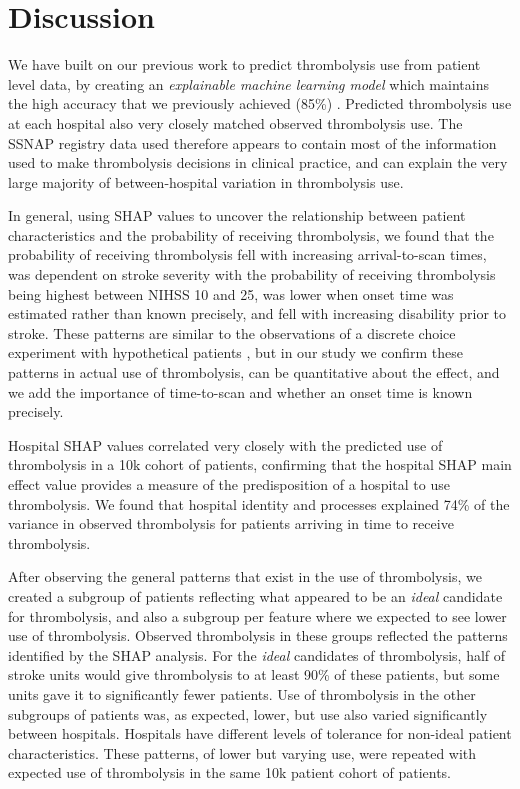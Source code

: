 \section{Discussion}

We have built on our previous work to predict thrombolysis use from patient level data, by creating an \emph{explainable machine learning model} which maintains the high accuracy that we previously achieved (85\%) \cite{allen_use_2022}. Predicted thrombolysis use at each hospital also very closely matched observed thrombolysis use. The SSNAP registry data used therefore appears to contain most of the information used to make thrombolysis decisions in clinical practice, and can explain the very large majority of between-hospital variation in thrombolysis use.

In general, using SHAP values to uncover the relationship between patient characteristics and the probability of receiving thrombolysis, we found that the probability of receiving thrombolysis fell with increasing arrival-to-scan times, was dependent on stroke severity with the probability of receiving thrombolysis being highest between NIHSS 10 and 25, was lower when onset time was estimated rather than known precisely, and fell with increasing disability prior to stroke. These patterns are similar to the observations of a discrete choice experiment with hypothetical patients \cite{de_brun_factors_2018}, but in our study we confirm these patterns in actual use of thrombolysis, can be quantitative about the effect, and we add the importance of time-to-scan and whether an onset time is known precisely. 

Hospital SHAP values correlated very closely with the predicted use of thrombolysis in a 10k cohort of patients, confirming that the hospital SHAP main effect value provides a measure of the predisposition of a hospital to use thrombolysis. We found that hospital identity and processes explained 74\% of the variance in observed thrombolysis for patients arriving in time to receive thrombolysis.

After observing the general patterns that exist in the use of thrombolysis, we created a subgroup of patients reflecting what appeared to be an \emph{ideal} candidate for thrombolysis, and also a subgroup per feature where we expected to see lower use of thrombolysis. Observed thrombolysis in these groups reflected the patterns identified by the SHAP analysis. For the \emph{ideal} candidates of thrombolysis, half of stroke units would give thrombolysis to at least 90\% of these patients, but some units gave it to significantly fewer patients. Use of thrombolysis in the other subgroups of patients was, as expected, lower, but use also varied significantly between hospitals. Hospitals have different levels of tolerance for non-ideal patient characteristics. These patterns, of lower but varying use, were repeated with expected use of thrombolysis in the same 10k patient cohort of patients.

